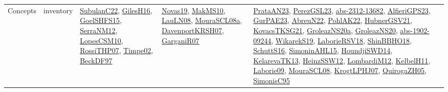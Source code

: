 {\begin{longtable}{lp{3cm}>{\raggedright}p{6cm}>{\raggedright}p{6cm}p{8cm}}
Concepts & inventory & \href{articles/SubulanC22.pdf}{SubulanC22}\cite{SubulanC22}, \href{papers/GilesH16.pdf}{GilesH16}\cite{GilesH16}, \href{articles/GoelSHFS15.pdf}{GoelSHFS15}\cite{GoelSHFS15}, \href{papers/SerraNM12.pdf}{SerraNM12}\cite{SerraNM12}, \href{articles/LopesCSM10.pdf}{LopesCSM10}\cite{LopesCSM10}, \href{papers/RossiTHP07.pdf}{RossiTHP07}\cite{RossiTHP07}, \href{articles/Timpe02.pdf}{Timpe02}\cite{Timpe02}, \href{papers/BeckDF97.pdf}{BeckDF97}\cite{BeckDF97} & \href{articles/Novas19.pdf}{Novas19}\cite{Novas19}, \href{papers/MakMS10.pdf}{MakMS10}\cite{MakMS10}, \href{papers/LauLN08.pdf}{LauLN08}\cite{LauLN08}, \href{papers/MouraSCL08a.pdf}{MouraSCL08a}\cite{MouraSCL08a}, \href{papers/DavenportKRSH07.pdf}{DavenportKRSH07}\cite{DavenportKRSH07}, \href{papers/GarganiR07.pdf}{GarganiR07}\cite{GarganiR07} & \href{articles/PrataAN23.pdf}{PrataAN23}\cite{PrataAN23}, \href{papers/PerezGSL23.pdf}{PerezGSL23}\cite{PerezGSL23}, \href{articles/abs-2312-13682.pdf}{abs-2312-13682}\cite{abs-2312-13682}, \href{articles/AlfieriGPS23.pdf}{AlfieriGPS23}\cite{AlfieriGPS23}, \href{articles/GurPAE23.pdf}{GurPAE23}\cite{GurPAE23}, \href{articles/AbreuN22.pdf}{AbreuN22}\cite{AbreuN22}, \href{articles/PohlAK22.pdf}{PohlAK22}\cite{PohlAK22}, \href{articles/HubnerGSV21.pdf}{HubnerGSV21}\cite{HubnerGSV21}, \href{papers/KovacsTKSG21.pdf}{KovacsTKSG21}\cite{KovacsTKSG21}, \href{papers/GroleazNS20a.pdf}{GroleazNS20a}\cite{GroleazNS20a}, \href{papers/GroleazNS20.pdf}{GroleazNS20}\cite{GroleazNS20}, \href{articles/abs-1902-09244.pdf}{abs-1902-09244}\cite{abs-1902-09244}, \href{articles/WikarekS19.pdf}{WikarekS19}\cite{WikarekS19}, \href{articles/LaborieRSV18.pdf}{LaborieRSV18}\cite{LaborieRSV18}, \href{articles/ShinBBHO18.pdf}{ShinBBHO18}\cite{ShinBBHO18}, \href{papers/SchuttS16.pdf}{SchuttS16}\cite{SchuttS16}, \href{articles/SimoninAHL15.pdf}{SimoninAHL15}\cite{SimoninAHL15}, \href{papers/HoundjiSWD14.pdf}{HoundjiSWD14}\cite{HoundjiSWD14}, \href{papers/KelarevaTK13.pdf}{KelarevaTK13}\cite{KelarevaTK13}, \href{articles/HeinzSSW12.pdf}{HeinzSSW12}\cite{HeinzSSW12}, \href{articles/LombardiM12.pdf}{LombardiM12}\cite{LombardiM12}, \href{articles/KelbelH11.pdf}{KelbelH11}\cite{KelbelH11}, \href{papers/Laborie09.pdf}{Laborie09}\cite{Laborie09}, \href{papers/MouraSCL08.pdf}{MouraSCL08}\cite{MouraSCL08}, \href{papers/KrogtLPHJ07.pdf}{KrogtLPHJ07}\cite{KrogtLPHJ07}, \href{papers/QuirogaZH05.pdf}{QuirogaZH05}\cite{QuirogaZH05}, \href{papers/SimonisC95.pdf}{SimonisC95}\cite{SimonisC95}\\

\end{longtable}}
